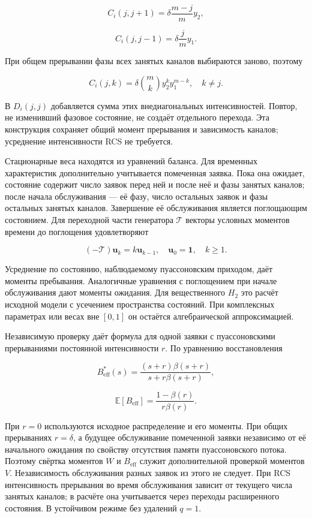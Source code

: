 \[C_i(j,j+1)=\delta\frac{m-j}{m}y_2,\]

\[C_i(j,j-1)=\delta\frac{j}{m}y_1.\]


При общем прерывании фазы всех занятых каналов выбираются заново, поэтому


\[C_i(j,k)=\delta\binom{m}{k}y_2^k y_1^{m-k},\quad k\ne j.\]


В \(D_i(j,j)\) добавляется сумма этих внедиагональных интенсивностей. Повтор, не изменивший фазовое состояние, не создаёт отдельного перехода. Эта конструкция сохраняет общий момент прерывания и зависимость каналов; усреднение интенсивности RCS не требуется.

Стационарные веса находятся из уравнений баланса. Для временных характеристик дополнительно учитывается помеченная заявка. Пока она ожидает, состояние содержит число заявок перед ней и после неё и фазы занятых каналов; после начала обслуживания --- её фазу, число остальных заявок и фазы остальных занятых каналов. Завершение её обслуживания является поглощающим состоянием. Для переходной части генератора \(\mathcal T\) векторы условных моментов времени до поглощения удовлетворяют


\[(-\mathcal T)\boldsymbol u_k=k\boldsymbol u_{k-1},\quad
\boldsymbol u_0=\mathbf1,\quad k\ge1.\]


Усреднение по состоянию, наблюдаемому пуассоновским приходом, даёт моменты пребывания. Аналогичные уравнения с поглощением при начале обслуживания дают моменты ожидания. Для вещественного \(H_2\) это расчёт исходной модели с усечением пространства состояний. При комплексных параметрах или весах вне \([0,1]\) он остаётся алгебраической аппроксимацией.

Независимую проверку даёт формула для одной заявки с пуассоновскими прерываниями постоянной интенсивности \(r.\) По уравнению восстановления \cite{pal2017}


\[B_{\mathrm{eff}}^*(s)=\frac{(s+r)\beta(s+r)}{s+r\beta(s+r)},\]

\[\mathbb E[B_{\mathrm{eff}}]=\frac{1-\beta(r)}{r\beta(r)}.\]


При \(r=0\) используются исходное распределение и его моменты. При общих прерываниях \(r=\delta\), а будущее обслуживание помеченной заявки независимо от её начального ожидания по свойству отсутствия памяти пуассоновского потока. Поэтому свёртка моментов \(W\) и \(B_{\mathrm{eff}}\) служит дополнительной проверкой моментов \(V.\) Независимость обслуживания разных заявок из этого не следует. При RCS интенсивность прерывания во время обслуживания зависит от текущего числа занятых каналов; в расчёте она учитывается через переходы расширенного состояния. В устойчивом режиме без удалений \(q=1.\)

